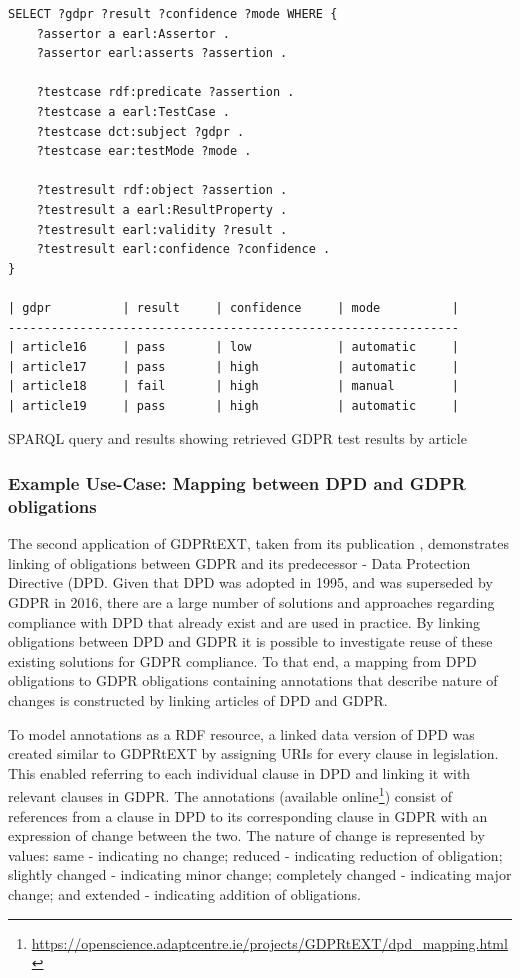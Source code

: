 \begin{listing}
\begin{verbatim}
SELECT ?gdpr ?result ?confidence ?mode WHERE {
    ?assertor a earl:Assertor .
    ?assertor earl:asserts ?assertion .

    ?testcase rdf:predicate ?assertion .
    ?testcase a earl:TestCase .
    ?testcase dct:subject ?gdpr .
    ?testcase ear:testMode ?mode .

    ?testresult rdf:object ?assertion .
    ?testresult a earl:ResultProperty .
    ?testresult earl:validity ?result .
    ?testresult earl:confidence ?confidence .
}

| gdpr          | result     | confidence     | mode          |
---------------------------------------------------------------
| article16     | pass       | low            | automatic     |
| article17     | pass       | high           | automatic     |
| article18     | fail       | high           | manual        |
| article19     | pass       | high           | automatic     |
\end{verbatim}
\label{code:voc:gdprtext-sparql}
\caption{SPARQL query and results showing retrieved GDPR test results by article}
\end{listing}

\subsubsection{Example Use-Case: Mapping between DPD and GDPR obligations}
The second application of GDPRtEXT, taken from its publication \cite{pandit_gdprtext_2018}, demonstrates linking of obligations between GDPR and its predecessor - Data Protection Directive (DPD. Given that DPD was adopted in 1995, and was superseded by GDPR in 2016, there are a large number of solutions and approaches regarding compliance with DPD that already exist and are used in practice. By linking obligations between DPD and GDPR it is possible to investigate reuse of these existing solutions for GDPR compliance. To that end, a mapping from DPD obligations to GDPR obligations containing annotations that describe nature of changes is constructed by linking articles of DPD and GDPR.

To model annotations as a RDF resource, a linked data version of DPD was created similar to GDPRtEXT by assigning URIs for every clause in legislation. This enabled referring to each individual clause in DPD and linking it with relevant clauses in GDPR. 
The annotations (available online\footnote{\url{https://openscience.adaptcentre.ie/projects/GDPRtEXT/dpd_mapping.html}}) consist of references from a clause in DPD to its corresponding clause in GDPR with an expression of change between the two. The nature of change is represented by values: same - indicating no change; reduced - indicating reduction of obligation; slightly changed - indicating minor change; completely changed - indicating major change; and extended - indicating addition of obligations.

